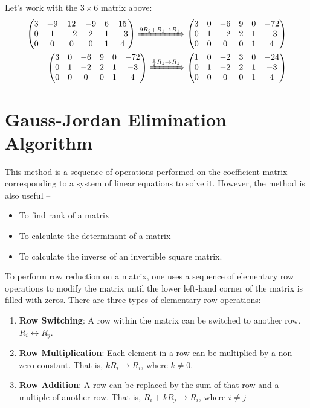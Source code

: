 \documentclass[conference,final,11pt,technote,onecolumn]{IEEEtran}\usepackage[]{graphicx}\usepackage[]{color}
\begin{document}
Let's work with the $3\times 6$ matrix above:
\begin{eqnarray}
\nonumber \begin{pmatrix}
      3 & -9 & 12 & -9 & 6 & 15 \\
      0 & 1  & -2 & 2 & 1  & -3\\
      0 & 0 & 0 & 0 & 1 & 4
			\end{pmatrix} \xRightarrow{9R_2+R_1\rightarrow R_1} \begin{pmatrix}
      3 & 0 & -6 & 9 & 0 & -72 \\
      0 & 1  & -2 & 2 & 1  & -3\\
      0 & 0 & 0 & 0 & 1 & 4
  		\end{pmatrix}\\
\nonumber \begin{pmatrix}
      3 & 0 & -6 & 9 & 0 & -72 \\
      0 & 1  & -2 & 2 & 1  & -3\\
      0 & 0 & 0 & 0 & 1 & 4
    	\end{pmatrix} \xRightarrow{\frac{1}{3}R_1\rightarrow R_1} \begin{pmatrix}
      1 & 0 & -2 & 3 & 0 & -24 \\
      0 & 1  & -2 & 2 & 1  & -3\\
      0 & 0 & 0 & 0 & 1 & 4
    	\end{pmatrix}
\end{eqnarray}
\section{Gauss-Jordan Elimination Algorithm}
\label{term:gauss_jordan_elimination_algorithm}
This method is a sequence of operations performed on the coefficient matrix corresponding to a system of linear equations to solve it\cite{wiki:GaussianElimination}. However, the method is also useful --
\begin{itemize}
  \item To find rank of a matrix
  \item To calculate the determinant of a matrix
  \item To calculate the inverse of an invertible square matrix.
\end{itemize}

To perform row reduction on a matrix, one uses a sequence of elementary row operations to modify the matrix until the lower left-hand corner of the matrix is filled with zeros. There are three types of elementary row operations:
\begin{enumerate}
  \item \textbf{Row Switching}: A row within the matrix can be switched to another row. $R_i \leftrightarrow R_j$.
  \item \textbf{Row Multiplication}: Each element in a row can be multiplied by a non-zero constant. That is, $kR_i \rightarrow R_i$, where $k\neq 0$.
  \item \textbf{Row Addition}: A row can be replaced by the sum of that row and a multiple of another row. That is, $R_i + kR_j \rightarrow R_i$, where $i\neq j$
\end{enumerate}
\end{document}
